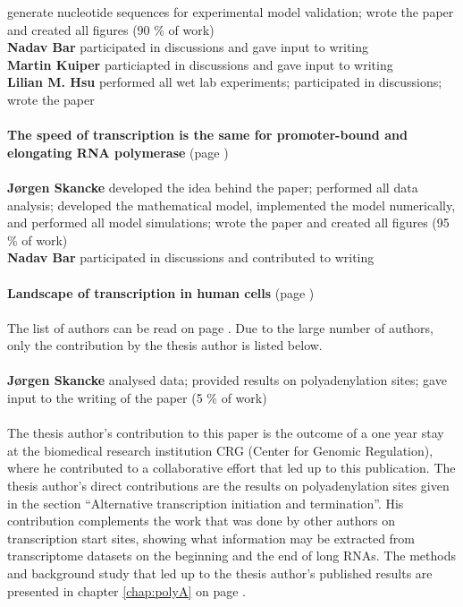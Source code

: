 generate nucleotide sequences for experimental model validation; wrote the
paper and created all figures (90 \% of work) \\
\textbf{Nadav Bar} participated in discussions and gave input to writing\\
\textbf{Martin Kuiper} particiapted in discussions and gave input to writing\\
\textbf{Lilian M. Hsu} performed all wet lab experiments;
participated in discussions; wrote the paper\\
\\
\textbf{The speed of transcription is the same for promoter-bound and
elongating RNA polymerase} (page \pageref{chap:kinetics_paper})\\
\\
\textbf{J\o rgen Skancke} developed the idea behind the paper;
performed all data analysis; developed the mathematical model, implemented the
model numerically, and performed all model simulations; wrote the
paper and created all figures (95 \% of work) \\
\textbf{Nadav Bar} participated in discussions and contributed to writing\\
\\
\textbf{Landscape of transcription in human cells} (page \pageref{landscape})\\
\\
The list of authors can be read on page \pageref{landscape}. Due to the large
number of authors, only the contribution by the thesis author is listed below.
\\
\\
\textbf{J\o rgen Skancke} analysed data; provided results on polyadenylation
sites; gave input to the writing of the paper (5 \% of work)\\
\\
The thesis author's contribution to this paper is the outcome of a one year
stay at the biomedical research institution CRG (Center for Genomic
Regulation), where he contributed to a collaborative effort that led up to this
publication. The thesis author's direct contributions are the results on
polyadenylation sites given in the section ``Alternative transcription
initiation and termination''. His contribution complements the work that was
done by other authors on transcription start sites, showing what information
may be extracted from transcriptome datasets on the beginning and the end of
long RNAs. The methods and background study that led up to the thesis author's
published results are presented in chapter \ref{chap:polyA} on page
\pageref{chap:polyA}.
